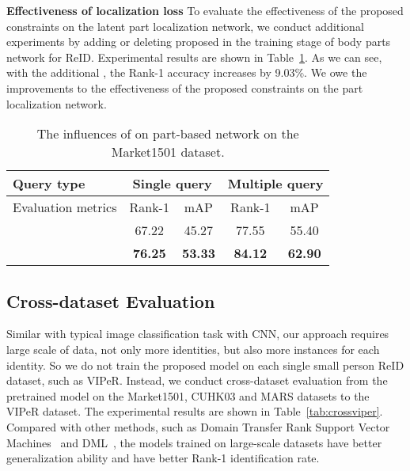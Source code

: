 \documentclass[10pt,twocolumn,letterpaper]{article}
\begin{document}
\textbf{Effectiveness of localization loss}
To evaluate the effectiveness of the proposed constraints on the latent part localization network, we conduct additional experiments by adding or deleting proposed  in the training stage of body parts network for ReID.
Experimental results are shown in Table~\ref{tab:stnconstrictmarket}.
As we can see, with the additional , the Rank-1 accuracy increases by 9.03\%.
We owe the improvements to the effectiveness of the proposed constraints on the part localization network.

\begin{table}[!tp]
  \begin{center}
  \scriptsize
    \begin{tabular}{|l|cc|cc|}
    \hline
    Query type & \multicolumn{2}{c|}{Single query} & \multicolumn{2}{c|}{Multiple query} \\
    \hline
    Evaluation metrics & Rank-1 & mAP   & Rank-1 & mAP \\
    \hline
    \hline
       &   67.22  & 45.27 & 77.55  & 55.40   \\
    \hline
     & \textbf{76.25}  & \textbf{53.33}  & \textbf{84.12}  & \textbf{62.90}  \\
    \hline
    \end{tabular}\end{center}
  \vspace{-0.5em}
  \caption{The influences of  on part-based network on the Market1501 dataset.}
  \vspace{-0.0em}
  \label{tab:stnconstrictmarket}\end{table}


\subsection{Cross-dataset Evaluation}
\label{exp:discussion}

Similar with typical image classification task with CNN, our approach requires large scale of data, not only more identities, but also more instances for each identity.
So we do not train the proposed model on each single small person ReID dataset, such as VIPeR.
Instead, we conduct cross-dataset evaluation from the pretrained model on the Market1501, CUHK03 and MARS datasets to the VIPeR dataset.
The experimental results are shown in Table~\ref{tab:crossviper}.
Compared with other methods, such as Domain Transfer Rank Support Vector Machines~\cite{MaICCV13domain} and DML~\cite{YiICPR14DML},
the models trained on large-scale datasets have better generalization ability and have better Rank-1 identification rate.
\end{document}
